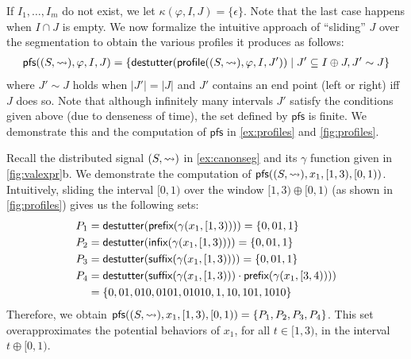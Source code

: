 If $I_1, \ldots, I_m$ do not exist, we let $\kappa(\varphi, I, J) = \{\epsilon\}$.
Note that the last case happens when $I \cap J$ is empty.
We now formalize the intuitive approach of ``sliding'' $J$ over the segmentation to obtain the 
various profiles it produces as follows:
%
\small
\begin{align*}
	\mathsf{pfs}((S,{\hb}), \varphi, I, J) = \{\destutter(\mathsf{profile}((S,{\hb}), \varphi, I, J')) \st J' \subseteq I \oplus J, J' \sim J\}
\end{align*}
\normalsize
where $J' \sim J$ holds when $|J'| = |J|$ and $J'$ contains an end point (left or right) iff $J$ does so.
Note that although infinitely many intervals $J'$ satisfy the conditions given above (due to denseness of time), the set defined by $\mathsf{pfs}$ is finite.
We demonstrate this and the computation of $\mathsf{pfs}$ in \cref{ex:profiles} and \cref{fig:profiles}.

\begin{example} \label{ex:profiles}
	Recall the distributed signal $(S, {\rightsquigarrow})$ in \cref{ex:canonseg} and its $\gamma$ function given in \cref{fig:valexpr}b.
	We demonstrate the computation of $\mathsf{pfs}((S,{\rightsquigarrow}), x_1, [1,3), [0,1))$.
	Intuitively, sliding the interval $[0,1)$ over the window $[1,3) \oplus [0,1)$ (as shown in \cref{fig:profiles}) gives us the following sets:
	\begin{align*}
		P_1 &= \mathsf{destutter}(\textsf{prefix}(\gamma(x_1, [1,3)))) = \{ 0, 01, 1 \}\\
		P_2 &= \mathsf{destutter}(\textsf{infix}(\gamma(x_1, [1,3)))) = \{ 0, 01, 1 \} \\
		P_3 &= \mathsf{destutter}(\textsf{suffix}(\gamma(x_1, [1,3)))) = \{ 0, 01, 1 \} \\
		P_4 &= \mathsf{destutter}(\textsf{suffix}(\gamma(x_1, [1,3))) \cdot \textsf{prefix}(\gamma(x_1, [3,4)))) \\
		&= \{ 0, 01, 010, 0101, 01010, 1, 10, 101, 1010 \}
	\end{align*}
	Therefore, we obtain $\mathsf{pfs}((S,{\rightsquigarrow}), x_1, [1,3), [0,1)) = \{P_1, P_2, P_3, P_4\}$.
	This set overapproximates the potential behaviors of $x_1$, for all $t \in [1,3)$, in the interval $t \oplus [0,1)$.
\end{example}



